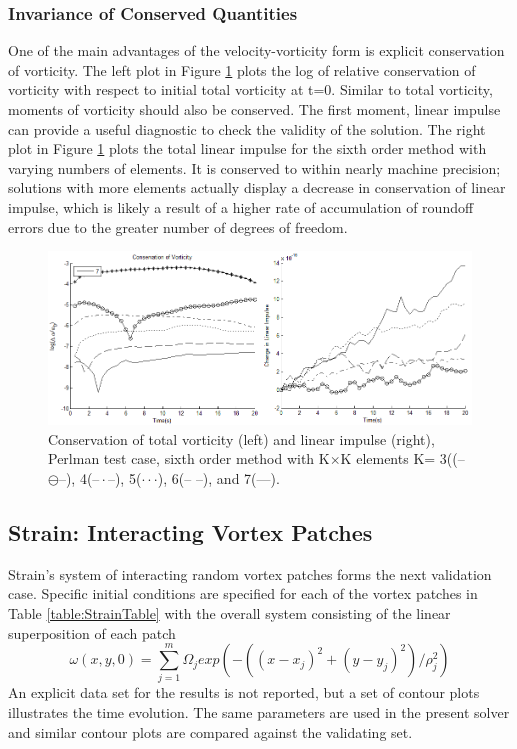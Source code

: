 \documentclass[]{aiaa-tc}%
\newcommand{\ben}[1]{\begin{equation}\label{#1}}
\newcommand{\ee}{\end{equation}}
\begin{document}
\subsubsection{Invariance of Conserved Quantities}\label{PConserveW}
One of the main advantages of the velocity-vorticity form is explicit conservation of vorticity. The left plot in Figure \ref{fig:PW_LinImpconserve} plots the log of relative conservation of vorticity with respect to initial total vorticity at t=0. Similar to total vorticity, moments of vorticity should also be conserved. The first moment, linear impulse can provide a useful diagnostic to check the validity of the solution. The right plot in Figure \ref{fig:PW_LinImpconserve} plots the total linear impulse for the sixth order method with varying numbers of elements. It is conserved to within nearly machine precision; solutions with more elements actually display a decrease in conservation of linear impulse, which is likely a result of a higher rate of accumulation of roundoff errors due to the greater number of degrees of freedom.

\begin{figure}
\centering
\includegraphics[width=1\textwidth]{PW_LinImpconserve.png}
\caption{\label{fig:PW_LinImpconserve}Conservation of total vorticity (left) and linear impulse (right), Perlman test case, sixth order method with K$\times$K elements K= 3((--\!$\ominus$\!--), 4(--\,$\cdot$\,--), 5($\cdot \cdot \cdot$), 6(--{ }--), and 7(---).}
\end{figure}

\subsection{Strain: Interacting Vortex Patches}
Strain's system of interacting random vortex patches \cite{Strain1996} forms the next validation case. Specific initial conditions are specified for each of the vortex patches in Table \ref{table:StrainTable} with the overall system consisting of the linear superposition of each patch
\ben{StrainV} \omega(x,y,0) = \sum_{j=1}^m \Omega_j exp(-((x-x_j)^2 + (y-y_j)^2)/\rho_j^2) \ee
An explicit data set for the results is not reported, but a set of contour plots illustrates the time evolution. The same parameters are used in the present solver and similar contour plots are compared against the validating set.
\end{document}
